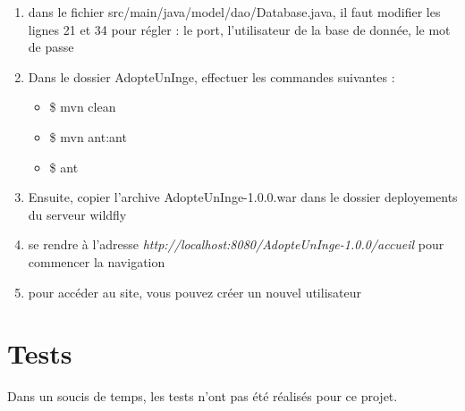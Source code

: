	\begin{enumerate}
		\item dans le fichier src/main/java/model/dao/Database.java, il faut modifier les lignes 21 et 34 pour régler : le port, l'utilisateur de la base de donnée, le mot de passe
		\item Dans le dossier AdopteUnInge, effectuer les commandes suivantes :
		\begin{itemize}
			\item \$ mvn clean
			\item \$ mvn ant:ant
			\item \$ ant
		\end{itemize}
		\item Ensuite, copier l'archive AdopteUnInge-1.0.0.war dans le dossier deployements du serveur wildfly
		\item se rendre à l'adresse \emph{http://localhost:8080/AdopteUnInge-1.0.0/accueil} pour commencer la navigation
		\item pour accéder au site, vous pouvez créer un nouvel utilisateur
	\end{enumerate}

\section{Tests}
	Dans un soucis de temps, les tests n'ont pas été réalisés pour ce projet.